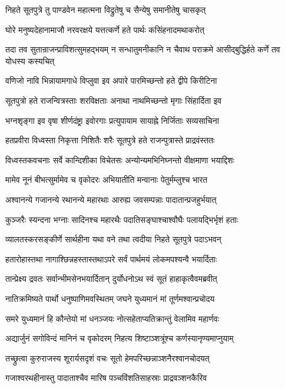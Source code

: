 \twolineshloka
{निहते सूतपुत्रे तु पाण्डवेन महात्मना}
{विद्रुतेषु च सैन्येषु समानीतेषु चासकृत्}


\twolineshloka
{घोरे मनुष्यदेहानामाजौ नरवरक्षये}
{यत्तत्कर्णे हते पार्थः कसिंहनादमथाकरोत्}


तदा तव सुतान्राजन्प्राविशत्सुमहद्भयम्
\twolineshloka
{न सन्धातुमनीकानि न चैवाथ पराक्रमे}
{आसीद्बुद्धिर्हते कर्णे तव योधस्य कस्यचित्}


\twolineshloka
{वणिजो नावि भिन्नायामगाधे विप्लुवा इव}
{अपारे पारमिच्छन्तो हते द्वीपे किरीटिना}


\twolineshloka
{सूतपुत्रो हते राजन्वित्रस्ताः शरविक्षताः}
{अनाथा नाथमिच्छन्तो मृगाः सिंहार्दिता इव}


\twolineshloka
{भग्नशृङ्गा इव वृषा शीर्णदंष्ट्रा इवोरगाः}
{प्रत्युपायाम सायाह्ने निर्जिताः सव्यसाचिना}


\twolineshloka
{हतप्रवीरा विध्वस्ता निकृत्ता निशितैः शरैः}
{सूतपुत्रे हते राजन्पुत्रास्ते प्राद्रवंस्ततः}


\twolineshloka
{विध्वस्तकवचनाः सर्वे कान्दिशीका विचेतसः}
{अन्योन्यमभिनिघ्नन्तो वीक्षमाणा भयाद्दिशः}


\twolineshloka
{मामेव नूनं बीभत्सुर्मामेव च वृकोदरः}
{अभियातीति मन्वानाः पेतुर्मम्लुश्च भारत}


\twolineshloka
{अश्वानन्ये गजानन्ये रथानन्ये महारथाः}
{आरुह्य जवसम्पन्नाः पादातान्प्रजहुर्भयात्}


\twolineshloka
{कुञ्जरैः स्यन्दना भग्नाः सादिनश्च महारथैः}
{पदातिसङ्घाश्चाश्वौघैः पलायद्भिर्भृशं हताः}


\twolineshloka
{व्यालतस्करसङ्कीर्णे सार्थहीना यथा वने}
{तथा त्वदीया निहते सूतपुत्रे पदाऽभवन्}


\twolineshloka
{हतारोहास्तथा नागाश्छिन्नहस्तास्तथाऽपरे}
{सर्वं पार्थमयं लोकमपश्यन्वै भयार्दिताः}


\twolineshloka
{तान्प्रेक्ष्य द्रवतः सर्वान्भीमसेनभयार्दितान्}
{दुर्योधनोऽथ स्वं सूतं हाहाकृत्वैवमब्रवीत्}


\twolineshloka
{नातिक्रमिष्यते पार्थो धनुष्पाणिमवस्थितम्}
{जघने युध्यमानं मां तूर्णमश्वान्प्रचोदय}


\twolineshloka
{समरे युध्यमानं हि कौन्तेयो मां धनञ्जयः}
{नोत्सहेताप्यतिक्रान्तुं वेलामिव महार्णवः}


\twolineshloka
{अद्यार्जुनं सगोविन्दं मानिनं च वृकोदरम्}
{निहत्य शिष्टाञ्शत्रूंश्च कर्णस्यानृण्यमाप्नुयाम्}


\twolineshloka
{तच्छ्रुत्वा कुरुराजस्य शूरार्यसदृशं वचः}
{सूतो हेमपरिच्छन्नाञ्शनैरश्वानचोदयत्}


\twolineshloka
{गजाश्वरथहीनास्तु पादाताश्चैव मारिष}
{पञ्चविंशतिसाहस्राः प्राद्रवञ्शनकैरिव}


